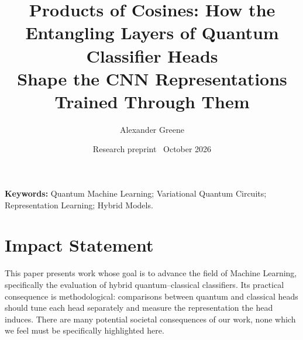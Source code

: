 \documentclass[11pt,letterpaper]{article}
\title{Products of Cosines: How the Entangling Layers of Quantum Classifier Heads\\
Shape the CNN Representations Trained Through Them}
\author{Alexander Greene}
\date{Research preprint \textemdash\ October 2026}
\theoremstyle{plain}
\theoremstyle{remark}
\begin{document}
\maketitle

\begin{abstract}

\end{abstract}

\noindent\textbf{Keywords:} Quantum Machine Learning; Variational Quantum Circuits;
Representation Learning; Hybrid Models.









\section*{Impact Statement}
This paper presents work whose goal is to advance the field of Machine Learning, specifically
the evaluation of hybrid quantum--classical classifiers. Its practical consequence is
methodological: comparisons between quantum and classical heads should tune each head
separately and measure the representation the head induces. There are many potential
societal consequences of our work, none which we feel must be specifically highlighted here.




\clearpage
\appendix

\end{document}

